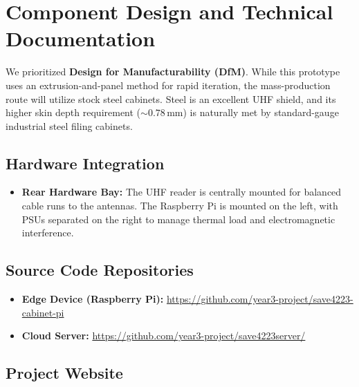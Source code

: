 \documentclass[12pt, a4paper]{article}
\begin{document}
\section{Component Design and Technical Documentation}
\label{sec:components}

We prioritized \textbf{Design for Manufacturability (DfM)}.
While this prototype uses an extrusion-and-panel method for rapid iteration, the mass-production route will utilize stock steel cabinets.
Steel is an excellent UHF shield, and its higher skin depth requirement ($\sim 0.78$\,mm) is naturally met by standard-gauge industrial steel filing cabinets.

\subsection{Hardware Integration}

\begin{itemize}[nosep]
  \item \textbf{Rear Hardware Bay:} The UHF reader is centrally mounted for balanced cable runs to the antennas. The Raspberry Pi is mounted on the left, with PSUs separated on the right to manage thermal load and electromagnetic interference.
\end{itemize}

\subsection{Source Code Repositories}

\begin{itemize}[nosep, leftmargin=2em]
  \item \textbf{Edge Device (Raspberry Pi):} \url{https://github.com/year3-project/save4223-cabinet-pi}
  \item \textbf{Cloud Server:} \url{https://github.com/year3-project/save4223server/}
\end{itemize}

\subsection{Project Website}
\end{document}
